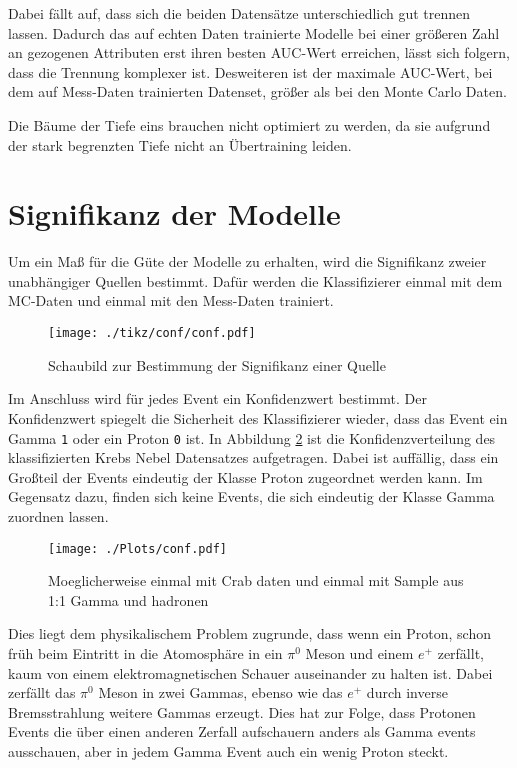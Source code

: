 Dabei fällt auf, dass sich die beiden Datensätze unterschiedlich gut trennen lassen.
Dadurch das auf echten Daten trainierte Modelle bei einer größeren Zahl an gezogenen Attributen erst ihren besten AUC-Wert erreichen, lässt sich folgern, dass die Trennung komplexer ist.
Desweiteren ist der maximale AUC-Wert, bei dem auf Mess-Daten trainierten Datenset, größer als bei den Monte Carlo Daten. 

Die Bäume der Tiefe eins brauchen nicht optimiert zu werden, da sie aufgrund der stark begrenzten Tiefe nicht an Übertraining leiden.

\section{Signifikanz der Modelle}
Um ein Maß für die Güte der Modelle zu erhalten, wird die Signifikanz zweier unabhängiger Quellen bestimmt. 
Dafür werden die Klassifizierer einmal mit dem MC-Daten und einmal mit den Mess-Daten trainiert. 
\begin{figure}[H]
  \centering
  \texttt{[image: ./tikz/conf/conf.pdf]}
  \caption{Schaubild zur Bestimmung der Signifikanz einer Quelle}
  \label{fig:<+label+>}
\end{figure}
Im Anschluss wird für jedes Event ein Konfidenzwert bestimmt. 
Der Konfidenzwert spiegelt die Sicherheit des Klassifizierer wieder, dass das Event ein Gamma \texttt{1} oder ein Proton \texttt{0} ist. 
In Abbildung \ref{fig:confdist} ist die Konfidenzverteilung des klassifizierten Krebs Nebel Datensatzes aufgetragen. 
Dabei ist auffällig, dass ein Großteil der Events eindeutig der Klasse Proton zugeordnet werden kann. 
Im Gegensatz dazu, finden sich keine Events, die sich eindeutig der Klasse Gamma zuordnen lassen.
\begin{figure}[H]
  \centering
  \texttt{[image: ./Plots/conf.pdf]}
  \caption{Moeglicherweise einmal mit Crab daten und einmal mit Sample aus 1:1 Gamma und hadronen}
  \label{fig:confdist}
\end{figure}
Dies liegt dem physikalischem Problem zugrunde, dass wenn ein Proton, schon früh beim Eintritt in die Atomosphäre in ein $\pi^{0}$ Meson und einem $e^{+}$ zerfällt, kaum von einem elektromagnetischen Schauer auseinander zu halten ist.
Dabei zerfällt das $\pi^{0}$ Meson in zwei Gammas, ebenso wie das $e^{+}$ durch inverse Bremsstrahlung weitere Gammas erzeugt. 
Dies hat zur Folge, dass Protonen Events die über einen anderen Zerfall aufschauern anders als Gamma events ausschauen, aber in jedem Gamma Event auch ein wenig Proton steckt.
